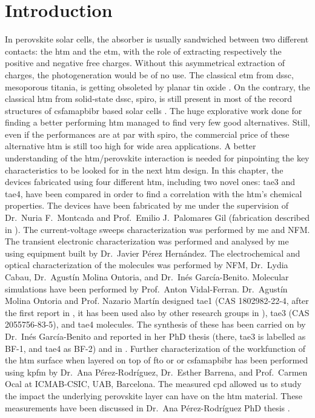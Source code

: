 


\section{Introduction}
In perovskite solar cells, the absorber is usually sandwiched between two different contacts: the \gls{htm} and the \gls{etm}, with the role of extracting respectively the positive and negative free charges.
Without this asymmetrical extraction of charges, the photogeneration would be of no use.
The classical \gls{etm} from \gls{dssc}, mesoporous titania, is getting obsoleted by planar tin oxide \cite{Jiang2018}.
On the contrary, the classical \gls{htm} from solid-state \gls{dssc}, \gls{spiro}, is still present in most of the record structures of \gls{csfamapbibr} based solar cells \cite{Saliba2016,Saliba2018}.
The huge explorative work done for finding a better performing \gls{htm} managed to find very few good alternatives.%
Still, even if the performances are at par with \gls{spiro}, the commercial price of these alternative \gls{htm} is still too high for wide area applications.
A better understanding of the \gls{htm}\-/perovskite interaction is needed for pinpointing the key characteristics to be looked for in the next \gls{htm} design.
In this chapter, the devices fabricated using four different \gls{htm}, including two novel ones: \gls{tae3} and \gls{tae4}, have been compared in order to find a correlation with the \gls{htm}'s chemical properties.
The devices have been fabricated by me under the supervision of Dr.\ Nuria F.\ Montcada and Prof.\ Emilio J.\ Palomares Gil (fabrication described in ).
The current\hyp{}voltage sweeps characterization was performed by me and NFM.
The transient electronic characterization was performed and analysed by me using equipment built by Dr.\ Javier Pérez Hernández.
The electrochemical and optical characterization of the molecules was performed by NFM, Dr.\ Lydia Cabau, Dr.\ Agustín Molina Ontoria, and Dr.\ Inés García\hyp{}Benito.
Molecular simulations have been performed by Prof.\ Anton Vidal\hyp{}Ferran.
Dr.\ Agustín Molina Ontoria and Prof. Nazario Martín designed \gls{tae1} (CAS 1802982-22-4, after the first report in \cite{Cabau2015a}, it has been used also by other research groups in \cite{Choi2015b,Labban2016,Wu2016a,Wu2016b}), \gls{tae3} (CAS 2055756-83-5), and \gls{tae4} molecules.
The synthesis of these has been carried on by Dr.\ Inés García\hyp{}Benito and reported in her PhD thesis \cite{Garcia-Benito2017} (there, \gls{tae3} is labelled as BF-1, and \gls{tae4} as BF-2) and in \cite{Gelmetti2019}.
Further characterization of the workfunction of the \gls{htm} surface when layered on top of \gls{fto} or  or \gls{csfamapbibr} has been performed using \gls{kpfm} by Dr.\ Ana Pérez-Rodríguez, Dr.\ Esther Barrena, and Prof.\ Carmen Ocal at ICMAB-CSIC, UAB, Barcelona.
The measured \gls{cpd} allowed us to study the impact the underlying perovskite layer can have on the \gls{htm} material.
These measurements have been discussed in Dr.\ Ana Pérez-Rodríguez PhD thesis \cite{Perez-Rodriguez2018}.

